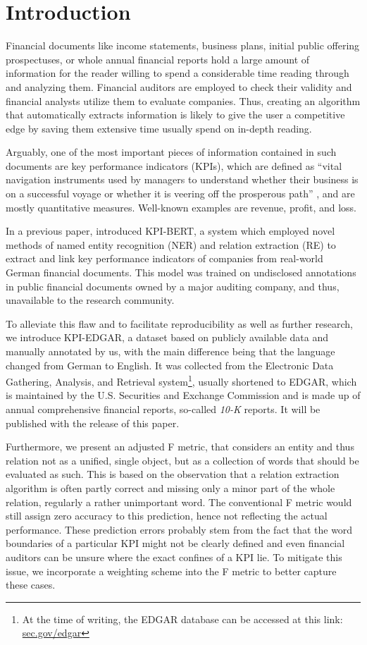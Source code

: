 \documentclass[conference, table]{IEEEtran}
\newcommand{\1} {\mathbbm{1}}
\begin{document}
\section{Introduction}
Financial documents like income statements, business plans, initial public offering prospectuses, or whole annual financial reports hold a large amount of information for the reader willing to spend a considerable time reading through and analyzing them. Financial auditors are employed to check their validity and financial analysts utilize them to evaluate companies. Thus, creating an algorithm that automatically extracts information is likely to give the user a competitive edge by saving them extensive time usually spend on in-depth reading. 

Arguably, one of the most important pieces of information contained in such documents are key performance indicators (KPIs), which are defined as ``vital navigation instruments used by managers to
understand whether their business is on a successful voyage or whether it is veering off the
prosperous path'' \cite{marr2012key}, and are mostly quantitative measures. Well-known examples are revenue, profit, and loss.

In a previous paper, \cite{kpi-bert} introduced KPI-BERT, a system which employed novel methods of named entity recognition (NER) and relation extraction (RE) to extract and link key performance indicators of companies from real-world German financial documents. This model was trained on undisclosed annotations in public financial documents owned by a major auditing company, and thus, unavailable to the research community.

To alleviate this flaw and to facilitate reproducibility as well as further research, we introduce KPI-EDGAR, a dataset based on publicly available data and manually annotated by us, with the main difference being that the language changed from German to English. It was collected from the Electronic Data Gathering, Analysis, and Retrieval system\footnote{At the time of writing, the EDGAR database can be accessed at this link:
\href{https://www.sec.gov/edgar.shtml}{sec.gov/edgar}}, usually shortened to EDGAR, which is maintained by the U.S. Securities and Exchange Commission and is made up of annual comprehensive financial reports, so-called \textit{10-K} reports.  It will be published with the release of this paper.

Furthermore, we present an adjusted F metric, that considers an entity and thus relation not as a unified, single object, but as a collection of words that should be evaluated as such. This is based on the observation that a relation extraction algorithm is often partly correct and missing only a minor part of the whole relation, regularly a rather unimportant word. The conventional F metric would still assign zero accuracy to this prediction, hence not reflecting the actual performance. These prediction errors probably stem from the fact that the word boundaries of a particular KPI might not be clearly defined and even financial auditors can be unsure where the exact confines of a KPI lie. To mitigate this issue, we incorporate a weighting scheme into the F metric to better capture these cases.
\end{document}

